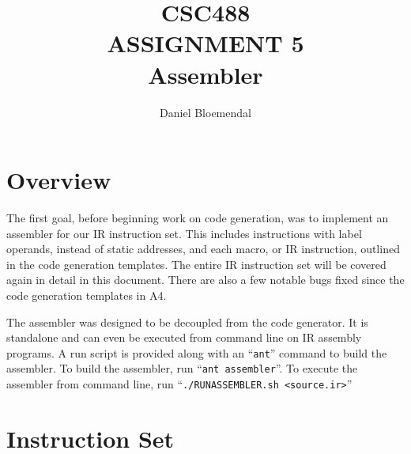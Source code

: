\documentclass[oneside]{amsart}
\theoremstyle{definition}
\theoremstyle{remark}
\numberwithin{equation}{section}
\begin{document}
\title[CSC488 A5]{CSC488\\ASSIGNMENT 5\\Assembler}
\author{Daniel Bloemendal}

\begin{titlepage}
\maketitle
\thispagestyle{empty}
\tableofcontents
\end{titlepage}

\section{Overview}
The first goal, before beginning work on code generation, was to implement an assembler for our IR
instruction set. This includes instructions with label operands, instead of static addresses, and
each macro, or IR instruction, outlined in the code generation templates. The entire IR instruction
set will be covered again in detail in this document. There are also a few notable bugs fixed since
the code generation templates in A4.

The assembler was designed to be decoupled from the code generator. It is standalone and can even be
executed from command line on IR assembly programs. A run script is provided along with an
``\texttt{ant}'' command to build the assembler. To build the assembler, run
``\texttt{ant assembler}''. To execute the assembler from command line, run
``\texttt{./RUNASSEMBLER.sh <source.ir>}''

\section{Instruction Set}


\end{document}
